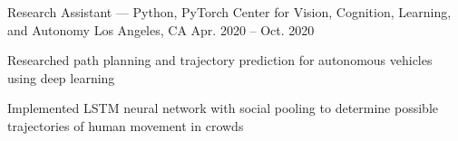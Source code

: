 \documentclass[12pt, letterpaper]{awesome-cv}
\begin{document}
\begin{cventries}
  \cventry
    {Research Assistant — Python, PyTorch} %
    {Center for Vision, Cognition, Learning, and Autonomy} %
    {Los Angeles, CA} %
    {Apr. 2020 -- Oct. 2020} %
    {
      \begin{cvitems} %
        \item {Researched path planning and trajectory prediction for autonomous vehicles using deep learning}
        \item {Implemented LSTM neural network with social pooling to determine possible trajectories of human movement in crowds}
      \end{cvitems}
    }



\end{cventries}
\end{document}
